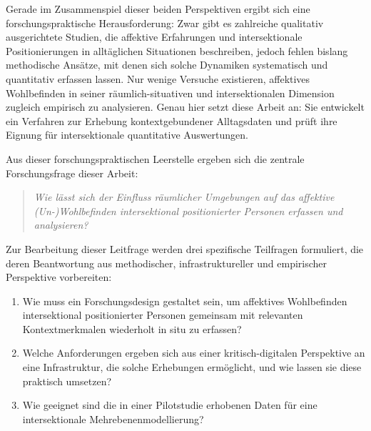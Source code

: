 
Gerade im Zusammenspiel dieser beiden Perspektiven ergibt sich eine forschungspraktische Herausforderung: Zwar gibt es zahlreiche qualitativ ausgerichtete Studien, die affektive Erfahrungen und intersektionale Positionierungen in alltäglichen Situationen beschreiben, jedoch fehlen bislang methodische Ansätze, mit denen sich solche Dynamiken systematisch und quantitativ erfassen lassen. Nur wenige Versuche existieren, affektives Wohlbefinden in seiner räumlich-situativen und intersektionalen Dimension zugleich empirisch zu analysieren. Genau hier setzt diese Arbeit an: Sie entwickelt ein Verfahren zur Erhebung kontextgebundener Alltagsdaten und prüft ihre Eignung für intersektionale quantitative Auswertungen.

\vspace{1em}

Aus dieser forschungspraktischen Leerstelle ergeben sich die zentrale Forschungsfrage dieser Arbeit:
\begin{quote}
\emph{Wie lässt sich der Einfluss räumlicher Umgebungen auf das affektive (Un-)Wohlbefinden intersektional positionierter Personen erfassen und analysieren?}
\end{quote}

Zur Bearbeitung dieser Leitfrage werden drei spezifische Teilfragen formuliert, die deren Beantwortung aus methodischer, infrastruktureller und empirischer Perspektive vorbereiten:

\begin{enumerate}
    \item Wie muss ein Forschungsdesign gestaltet sein, um affektives Wohlbefinden intersektional positionierter Personen gemeinsam mit relevanten Kontextmerkmalen wiederholt in situ zu erfassen?
    \item Welche Anforderungen ergeben sich aus einer kritisch-digitalen Perspektive an eine Infrastruktur, die solche Erhebungen ermöglicht, und wie lassen sie diese praktisch umsetzen?
    \item Wie geeignet sind die in einer Pilotstudie erhobenen Daten für eine intersektionale Mehrebenenmodellierung?
\end{enumerate}

